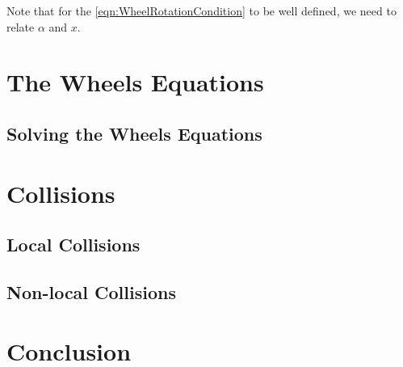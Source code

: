 \documentclass[]{article}
\begin{document}
	Note that for the \eqref{eqn:WheelRotationCondition} to be well defined, we need to relate $\alpha$ and $x$.
	
	
	\section{The Wheels Equations}
	\subsection{Solving the Wheels Equations}
	
	\section{Collisions}
	\subsection{Local Collisions}
	\subsection{Non-local Collisions}
	
	\section{Conclusion}
	
\end{document}
